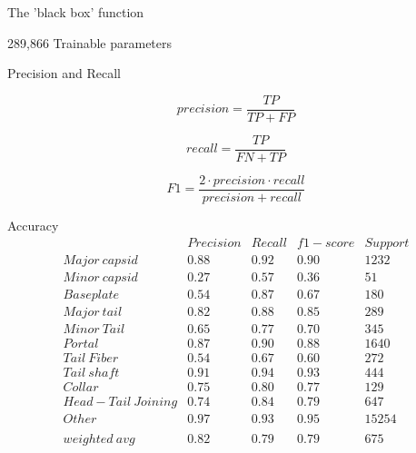 \documentclass{beamer}
\begin{document}
\begin{frame}{The 'black box' function}
 \\
\begin{center}
289,866 Trainable parameters
\end{center}
\end{frame}

\begin{frame}{Precision and Recall}
\begin{minipage}[t]{0.3\textwidth}
\vspace{-2cm}
$$precision = \frac{TP}{TP+FP}$$
\end{minipage}
\begin{minipage}[t]{0.3\textwidth}
$$recall= \frac{TP}{FN+TP}$$
\end{minipage}
\begin{minipage}[t]{0.3\textwidth}
\vspace{2cm}
$$F1 = \frac{2 \cdot precision\cdot recall}{precision+ recall}$$
\end{minipage}
\hfill
\end{frame}

\begin{frame}{Accuracy}
$$
\begin{matrix}
 & Precision & Recall & f1-score & Support\\ 
Major\ capsid & 0.88 & 0.92 & 0.90 & 1232\\ 
Minor\ capsid & 0.27 & 0.57 & 0.36 & 51\\ 
Baseplate & 0.54 & 0.87 & 0.67 & 180\\ 
Major\ tail & 0.82 & 0.88 & 0.85 & 289\\ 
Minor\ Tail & 0.65 & 0.77 & 0.70 & 345\\ 
Portal & 0.87 & 0.90 & 0.88 & 1640\\ 
Tail\ Fiber & 0.54 & 0.67 & 0.60 & 272\\  
Tail\ shaft & 0.91 & 0.94 & 0.93 & 444\\ 
Collar & 0.75 & 0.80 & 0.77 & 129\\ 
Head-Tail\ Joining & 0.74 & 0.84 & 0.79 & 647\\
Other & 0.97 & 0.93 & 0.95 & 15254\\ 
 &  &  &  & \\ 
weighted\ avg & 0.82 & 0.79 & 0.79 & 675 
\end{matrix}
$$
\end{frame}
\end{document}
